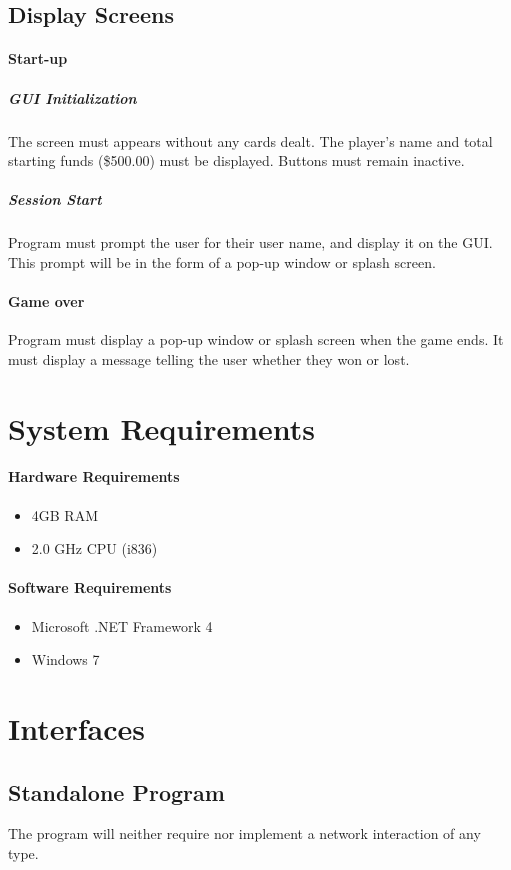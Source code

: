 \documentclass[12pt]{article}
\begin{document}
\subsection{Display Screens}
\paragraph{Start-up}
\subparagraph{GUI Initialization}
The screen must appears without any cards dealt.  The player's name and total
starting funds (\$500.00) must be displayed.  Buttons must remain inactive. 
\subparagraph{Session Start}
Program must prompt the user for their user name, and display it on the GUI. 
This prompt will be in the form of a pop-up window or splash screen.
\paragraph{Game over}
Program must display a pop-up window or splash screen when the game ends. It
must display a message telling the user whether they won or lost.  

\section{System Requirements}
\paragraph{Hardware Requirements}
\begin{itemize}
\item 4GB RAM
\item 2.0 GHz CPU (i836)
\end{itemize}
\paragraph{Software Requirements}
\begin{itemize}
\item Microsoft .NET Framework 4
\item Windows 7
\end{itemize}

\section{Interfaces}\label{sec:interfaces}
\subsection{Standalone Program}
The program will neither require nor implement a network interaction of any
type.
\end{document}
